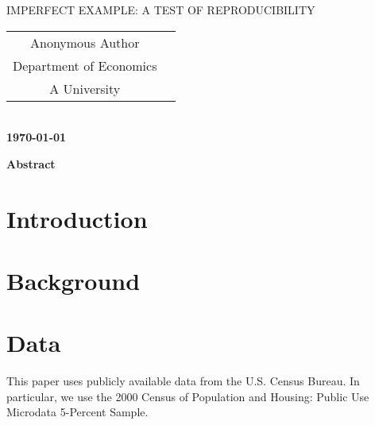 \documentclass[12pt,titlepage]{article}
\date{\myversion
}
\makeatletter
\newcommand{\mytitle}{Imperfect Example: A Test of Reproducibility}
\newcommand{\mythanks}{
}
\def\blfootnote{\xdef\@thefnmark{}\@footnotetext}
\makeatother
\begin{document}

	\begin{titlepage}
		\begin{center}
			\Large\MakeUppercase{\mytitle} \\ [.5cm]
			\large
			\begin{tabular}{cc}
			Anonymous Author  \\
			Department of Economics  \\
			A University  

			\end{tabular} \\ [2cm]
			\textbf{\today\blfootnote{\mythanks}} \\ [2cm]
		\end{center}
\end{titlepage}



	\thispagestyle{empty}
	\singlespacing
		\begin{center}
			\textbf{Abstract} \\ [.5cm]
		\end{center}
	
	 \newpage
	 \setcounter{page}{1}
	\doublespacing
\section{Introduction}
\label{sec:intro}


\section{Background}
\label{sec:background}


\section{Data}
\label{sec:Data}

This paper uses publicly available data from the U.S. Census Bureau. In particular, we use the 2000 Census of Population and Housing: Public Use Microdata 5-Percent Sample. 
\end{document}
